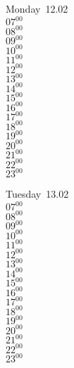 \documentclass[11pt, a4paper]{book}\usepackage[]{graphicx}\usepackage[]{color}
\begin{document}
\begin{headerbox}
\end{headerbox}
\begin{weekdaybox}
  Monday~12.02\\
  { 
  \vfill
  $07^{00}$\\
$08^{00}$\\
$09^{00}$\\
$10^{00}$\\
$11^{00}$\\
$12^{00}$\\
$13^{00}$\\
$14^{00}$\\
$15^{00}$\\
$16^{00}$\\
$17^{00}$\\
$18^{00}$\\
$19^{00}$\\
$20^{00}$\\
$21^{00}$\\
$22^{00}$\\
$23^{00}$\\
  }
\end{weekdaybox}
\begin{weekdaybox}
  Tuesday~13.02\\
  { 
  \vfill
  $07^{00}$\\
$08^{00}$\\
$09^{00}$\\
$10^{00}$\\
$11^{00}$\\
$12^{00}$\\
$13^{00}$\\
$14^{00}$\\
$15^{00}$\\
$16^{00}$\\
$17^{00}$\\
$18^{00}$\\
$19^{00}$\\
$20^{00}$\\
$21^{00}$\\
$22^{00}$\\
$23^{00}$\\
  }
\end{weekdaybox}
\end{document}
